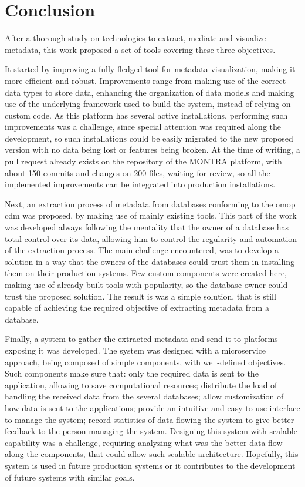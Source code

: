 
\chapter{Conclusion}
\label{chapter:conclusion}
After a thorough study on technologies to extract, mediate and visualize metadata, this work proposed a set of tools covering these three objectives.

It started by improving a fully-fledged tool for metadata visualization, making it more efficient and robust.
Improvements range from making use of the correct data types to store data, enhancing the organization of data models and making use of the underlying framework used to build the system, instead of relying on custom code.
As this platform has several active installations, performing such improvements was a challenge, since special attention was required along the development, so such installations could be easily migrated to the new proposed version with no data being lost or features being broken.
At the time of writing, a pull request already exists on the repository of the MONTRA platform, with about 150 commits and changes on 200 files, waiting for review, so all the implemented improvements can be integrated into production installations.

Next, an extraction process of metadata from databases conforming to the \gls{omop} \gls{cdm} was proposed, by making use of mainly existing tools.
This part of the work was developed always following the mentality that the owner of a database has total control over its data, allowing him to control the regularity and automation of the extraction process.
The main challenge encountered, was to develop a solution in a way that the owners of the databases could trust them in installing them on their production systems.
Few custom components were created here, making use of already built tools with popularity, so the database owner could trust the proposed solution.
The result is was a simple solution, that is still capable of achieving the required objective of extracting metadata from a database.

Finally, a system to gather the extracted metadata and send it to platforms exposing it was developed.
The system was designed with a microservice approach, being composed of simple components, with well-defined objectives.
Such components make sure that: only the required data is sent to the application, allowing to save computational resources; distribute the load of handling the received data from the several databases; allow customization of how data is sent to the applications; provide an intuitive and easy to use interface to manage the system; record statistics of data flowing the system to give better feedback to the person managing the system.
Designing this system with scalable capability was a challenge, requiring analyzing what was the better data flow along the components, that could allow such scalable architecture.
Hopefully, this system is used in future production systems or it contributes to the development of future systems with similar goals.

